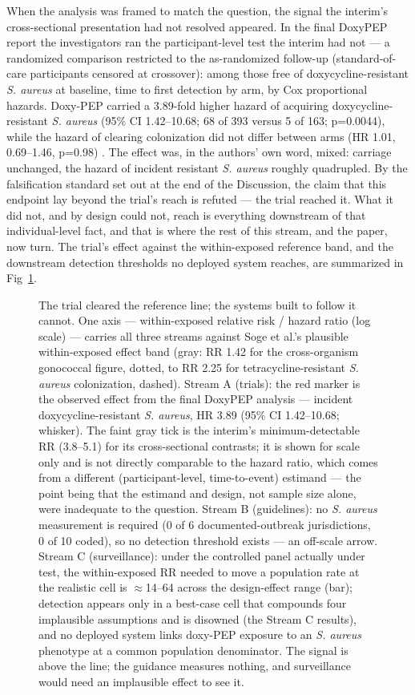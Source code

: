 \documentclass[10pt,letterpaper]{article}
\begin{document}
When the analysis was framed to match the question, the signal the
interim's cross-sectional presentation had not resolved appeared. In the
final DoxyPEP report the investigators ran the participant-level test
the interim had not --- a randomized comparison restricted to the
as-randomized follow-up (standard-of-care participants censored at
crossover): among those free of doxycycline-resistant \emph{S. aureus}
at baseline, time to first detection by arm, by Cox proportional
hazards. Doxy-PEP carried a 3.89-fold higher hazard of
acquiring doxycycline-resistant \emph{S. aureus} (95\% CI 1.42--10.68;
68 of 393 versus 5 of 163; p=0.0044), while the hazard of
clearing colonization did not differ between arms (HR 1.01,
0.69--1.46, p=0.98) \cite{luetkemeyer2025}. The effect was, in the
authors' own word, mixed: carriage unchanged, the hazard of incident resistant \emph{S. aureus} roughly quadrupled. By the falsification standard set out at the end of the
Discussion, the claim that this endpoint lay beyond the trial's reach is
refuted --- the trial reached it. What it did not, and by design could
not, reach is everything downstream of that individual-level fact, and
that is where the rest of this stream, and the paper, now turn. The trial's effect against the within-exposed reference band, and the downstream detection thresholds no deployed system reaches, are summarized in Fig~\ref{fig2}.

\begin{figure}[!ht]
\caption{The trial cleared the reference line; the systems built to follow it cannot.
One axis --- within-exposed relative risk / hazard ratio (log scale) --- carries all three streams
against Soge et al.'s plausible within-exposed effect band (gray: RR 1.42 for the cross-organism
gonococcal figure, dotted, to RR 2.25 for tetracycline-resistant \emph{S. aureus} colonization,
dashed). Stream A (trials): the red marker is the observed effect from the final
DoxyPEP analysis --- incident doxycycline-resistant \emph{S. aureus}, HR 3.89 (95\% CI
1.42--10.68; whisker). The faint gray tick is the interim's minimum-detectable RR (3.8--5.1) for its
cross-sectional contrasts; it is shown for scale only and is not directly comparable to the
hazard ratio, which comes from a different (participant-level, time-to-event) estimand --- the point
being that the estimand and design, not sample size alone, were inadequate to the question. Stream B
(guidelines): no \emph{S. aureus} measurement is required (0 of 6 documented-outbreak jurisdictions,
0 of 10 coded), so no detection threshold exists --- an off-scale arrow. Stream C
(surveillance): under the controlled panel actually under test, the within-exposed RR needed to move
a population rate at the realistic cell is $\approx$14--64 across the design-effect range (bar);
detection appears only in a best-case cell that compounds four implausible assumptions and is disowned
(the Stream C results), and no deployed system links doxy-PEP exposure to an \emph{S. aureus} phenotype
at a common population denominator. The signal is above the line; the guidance measures nothing, and
surveillance would need an implausible effect to see it.}
\label{fig2}
\end{figure}
\end{document}
